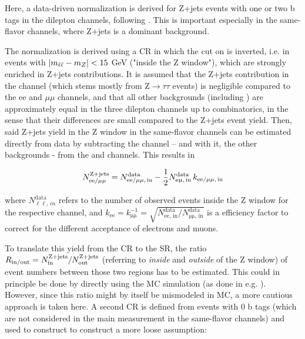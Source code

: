 Here, a data-driven normalization is derived for Z+jets events with one or two b tags in the dilepton channels, following . This is important especially in the same-flavor channels, where Z+jets is a dominant background.

The normalization is derived using a CR in which the cut on \mll is inverted, i.e. in events with $| m_{\ell\ell} - m_Z | < 15$ GeV ("inside the Z window"), which are strongly enriched in Z+jets contributions. It is assumed that the Z+jets contribution in the \emu channel (which stems mostly from $\mathrm{Z} \rightarrow \tau \tau$ events) is negligible compared to the ee and $\mu \mu$ channels, and that all other backgrounds (including \ttbar) are approximately equal in the three dilepton channels up to combinatorics, in the sense that their differences are small compared to the Z+jets event yield. Then, said Z+jets yield in the Z window in the same-flavor channels can be estimated directly from data by subtracting the \emu channel -- and with it, the other backgrounds - from the \ee and \mumu channels. This results in

\begin{equation}
\label{eq:ttxs:zjets_yield}
    N_{\mathrm{ee / \mu\mu}}^{\mathrm{Z+jets}} = N_{\mathrm{ee / \mu\mu,\,in}}^{\mathrm{data}} - \frac{1}{2} N_{\mathrm{\mathrm{e\upmu},\,in}}^{\mathrm{data}} \, k_{\mathrm{ee / \mu\mu,\,in}}
\end{equation}

\noindent where $N_{\mathrm{\ell \ell},\,in}^{\mathrm{data}}$ refers to the number of observed events inside the Z window for the respective channel, and $k_{\mathrm{ee}} = k_{\mathrm{\mu\mu}}^{-1} = \sqrt{N_{\mathrm{ee,\,in}}^{\mathrm{data}} / N_{\mathrm{\mu\mu,\,in}}^{\mathrm{data}}}$ is a efficiency factor to correct for the different acceptance of electrons and muons.

To translate this yield from the CR to the SR, the ratio $R_{\mathrm{in/out}} = N_{\mathrm{in}}^{\mathrm{Z+jets}} / N_{\mathrm{out}}^{\mathrm{Z+jets}}$ (referring to \textit{inside} and \textit{outside} of the Z window) of event numbers between those two regions has to be estimated. This could in principle be done by directly using the MC simulation (as done in e.g. ). However, since this ratio might by itself be mismodeled in MC, a more cautious approach is taken here. A second CR is defined from events with 0 b tags (which are not considered in the main measurement in the same-flavor channels) and used to construct to construct a more loose assumption:

